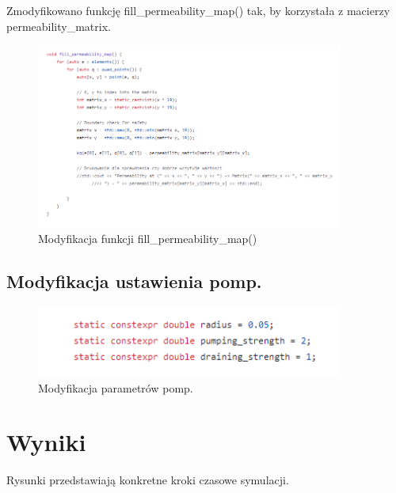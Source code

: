 \documentclass[onecolumn,12pt]{article}
\begin{document}
Zmodyfikowano funkcję fill\_permeability\_map() tak, by korzystała z macierzy permeability\_matrix.
\begin{figure}[H]
    \centering
    \includegraphics[width=0.9\textwidth]{fill_permeability_map.png}
    \caption{Modyfikacja funkcji fill\_permeability\_map()}
    \label{fig:example}
\end{figure}

\subsection{Modyfikacja ustawienia pomp.}
 
\begin{figure}[H]
    \centering
    \includegraphics[width=0.9\textwidth]{pumps_params.png}
    \caption{Modyfikacja parametrów pomp.}
    \label{fig:example}
\end{figure}
\section{Wyniki}

Rysunki przedstawiają konkretne kroki czasowe symulacji.
\end{document}
